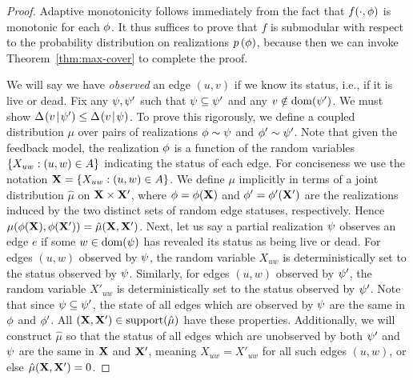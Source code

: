 \begin{proof}
Adaptive monotonicity follows immediately from the fact that $f(\cdot,\rlz)$ is monotonic for each $\rlz$.
It thus suffices to prove that $f$ is \term submodular with respect to the
probability distribution on realizations $\rlzprior$, 
%
because then we can invoke
Theorem~\ref{thm:max-cover} to complete the proof.

 We will say we have \emph{observed} an edge $(u,v)$ if we know its
status, i.e., if it is live or dead. 
Fix any $\prlz, \prlz'$ such that 
$\prlz \subseteq \prlz'$ and any $v \notin \dom(\prlz')$.
We must show $\diff{\prlz'}{v} \le \diff{\prlz}{v}$.
%
To prove this rigorously, 
we define a coupled distribution $\mu$ over pairs of realizations $\rlz \sim
\prlz$ and $\rlz' \sim \prlz'$.  Note that given the feedback model,
the realization $\rlz$ is a function
of the random variables $\set{X_{uw} : (u, w)
  \in A}$ indicating the status of each edge.  For conciseness we use
the notation $\Xvec = \set{X_{uw} : (u, w) \in A}$. 
We  define $\mu$ implicitly in terms of a
joint distribution $\hat{\mu}$ on $\Xvec \times \Xvec'$, 
where $\rlz = \rlz(\Xvec)$ and 
$\rlz' = \rlz'(\Xvec')$ are the realizations
induced by the two distinct sets of random edge statuses, respectively.
Hence $\mu( \rlz(\Xvec ),  \rlz(\Xvec' )) = \hat{\mu}(\Xvec, \Xvec')$.
%
Next, let us say a partial realization $\prlz$ observes an edge $e$ if 
some $w \in \dom(\prlz)$ has revealed its status as being live or
dead.
For edges $(u,w)$ observed by $\prlz$, the random variable
$X_{uw}$ is deterministically set to the status observed by $\prlz$.
Similarly, for edges $(u,w)$ observed by $\prlz'$, the random variable
$X'_{uw}$ is deterministically set to the status observed by $\prlz'$.
Note that since $\prlz \subseteq \prlz'$, the 
state of all edges which are
observed by $\prlz$ are the same in $\rlz$ and $\rlz'$.
All $(\Xvec, \Xvec') \in \support(\hat{\mu})$ have these properties.
Additionally, we will construct $\hat{\mu}$ so that 
the status of all edges which are
unobserved by both $\prlz'$ and $\prlz$ are the same in $\Xvec$ and $\Xvec'$, meaning 
$X_{uw} = X'_{uw}$ for all such edges $(u,w)$, or else $\hat{\mu}(\Xvec,\Xvec') = 0$.



\end{proof}
